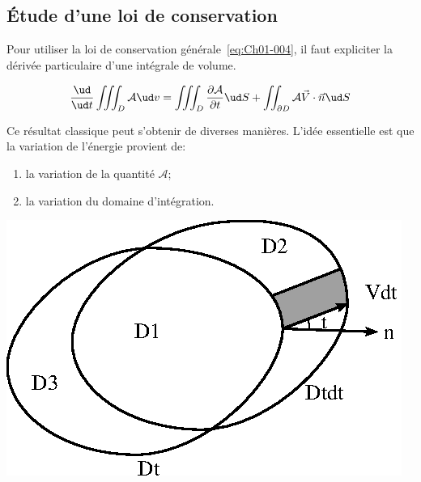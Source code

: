 \subsection{Étude d'une loi de conservation} \label{ssec:Ch01-1.2}
Pour utiliser la loi de conservation générale~\eqref{eq:Ch01-004}, il faut expliciter la dérivée particulaire d'une intégrale de volume.
\begin{lem}\label{lem:Ch01-1}
    \begin{equation}
        \frac{\ud}{\ud t}\iiint_D \mathcal{A} \ud v =\iiint_D\frac{\partial \mathcal{A}}{\partial t}\ud S+\iint_{\partial D}\mathcal{A}\vec{V}\cdot\vec{n}\ud S
        \label{eq:Ch01-005}
    \end{equation}
\end{lem}
\begin{multicols}{2}
    \raggedcolumns
    \setcounter{unbalance}{2}
Ce résultat classique peut s'obtenir de diverses manières.
L'idée essentielle est que la variation de l'énergie provient de:
\begin{enumerate}
    \item la variation de la quantité $\mathcal{A}$;
    \item la variation du domaine d'intégration.
\end{enumerate}
\columnbreak
\begin{center}
    \includegraphics[scale=1]{../images/T1_Ch01-0002.eps}
\end{center}
\end{multicols}

